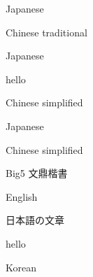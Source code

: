 \documentclass[english]{article}
\begin{document}
 
\begin{CJK}{UTF8}{}%
Japanese \end{CJK} \begin{CJK}{UTF8}{}Chinese traditional\end{CJK} \begin{CJK}{UTF8}{}
Japanese \end{CJK}
hello
\begin{CJK}{UTF8}{}%
Chinese simplified \end{CJK}\begin{CJK}{UTF8}{hei} Japanese \end{CJK} \begin{CJK}{UTF8}{}Chinese simplified
\end{CJK}

\begin{CJK}{UTF8}{}
Big5 文鼎楷書
\end{CJK}

%
%
English

\begin{CJK}{UTF8}{}
日本語の文章
\end{CJK}

hello

\begin{CJK}{UTF8}{}%
Korean
\end{CJK}
\end{document}
